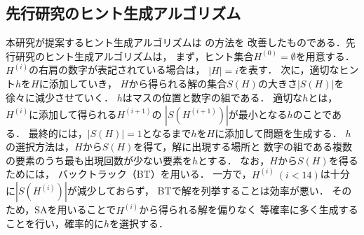 \documentclass[a4paper, 9pt]{jarticle}
\begin{document}
\begin{論文概要}
\section{先行研究のヒント生成アルゴリズム}
本研究が提案するヒント生成アルゴリズムは \cite{previous_research} の方法を
改善したものである．先行研究のヒント生成アルゴリズムは，
まず，ヒント集合$H^{(0)} = \emptyset$を用意する．
$H^{(i)}$の右肩の数字が表記されている場合は，
$|H| = i$を表す．
次に，適切なヒント$h$を$H$に添加していき，
$H$から得られる解の集合$S(H)$の大きさ$|S(H)|$を徐々に減少させていく．
$h$はマスの位置と数字の組である．
適切な$h$とは，$H^{(i)}$に添加して得られる$H^{(i+1)}$の
$|S(H^{(i+1)})|$が最小となる$h$のことである．
最終的には，$|S(H)| = 1$となるまで$h$を$H$に添加して問題を生成する．
$h$の選択方法は，$H$から$S(H)$を得て，解に出現する場所と
数字の組である複数の要素のうち最も出現回数が少ない要素を$h$とする．
なお，$H$から$S(H)$を得るためには，
バックトラック（BT）を用いる．
一方で，$H^{(i)} ~ (i < 14)$は十分に$|S(H^{(i)})|$が減少しておらず，
BTで解を列挙することは効率が悪い．
そのため，SAを用いることで$H^{(i)}$から得られる解を偏りなく
等確率に多く生成することを行い，確率的に$h$を選択する．


\end{論文概要}
\end{document}
